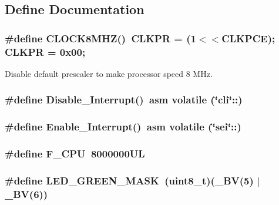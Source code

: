 \subsection{Define Documentation}
\subsubsection{\setlength{\rightskip}{0pt plus 5cm}\#define CLOCK8MHZ()~CLKPR = (1$<$$<$CLKPCE); CLKPR = 0x00;}\label{kernel_8h_27233a44a4a8fb585f8aff8d4a5ec48c}


Disable default prescaler to make processor speed 8 MHz. 
\subsubsection{\setlength{\rightskip}{0pt plus 5cm}\#define Disable\_\-Interrupt()~asm volatile (\char`\"{}cli\char`\"{}::)}\label{kernel_8h_f191103ba7b5db1d681e028e0120f352}


\subsubsection{\setlength{\rightskip}{0pt plus 5cm}\#define Enable\_\-Interrupt()~asm volatile (\char`\"{}sei\char`\"{}::)}\label{kernel_8h_8b76c3db3d5ee084c90ff0225cd746a6}


\subsubsection{\setlength{\rightskip}{0pt plus 5cm}\#define F\_\-CPU~8000000UL}\label{kernel_8h_43bafb28b29491ec7f871319b5a3b2f8}


\subsubsection{\setlength{\rightskip}{0pt plus 5cm}\#define LED\_\-GREEN\_\-MASK~(uint8\_\-t)(\_\-BV(5) $|$ \_\-BV(6))}\label{kernel_8h_585dde11706a53b5e3ece925496dc96d}


